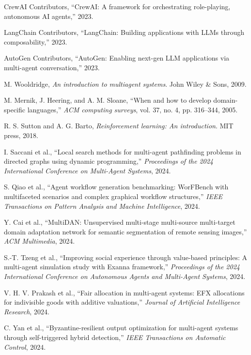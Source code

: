 \documentclass[conference]{IEEEtran}
\begin{document}
\begin{thebibliography}{00}
 CrewAI Contributors, ``CrewAI: A framework for orchestrating role-playing, autonomous AI agents,'' 2023.

 LangChain Contributors, ``LangChain: Building applications with LLMs through composability,'' 2023.

 AutoGen Contributors, ``AutoGen: Enabling next-gen LLM applications via multi-agent conversation,'' 2023.

 M. Wooldridge, \emph{An introduction to multiagent systems}. John Wiley \& Sons, 2009.

 M. Mernik, J. Heering, and A. M. Sloane, ``When and how to develop domain-specific languages,'' \emph{ACM computing surveys}, vol. 37, no. 4, pp. 316--344, 2005.

 R. S. Sutton and A. G. Barto, \emph{Reinforcement learning: An introduction}. MIT press, 2018.

 I. Saccani et al., ``Local search methods for multi-agent pathfinding problems in directed graphs using dynamic programming,'' \emph{Proceedings of the 2024 International Conference on Multi-Agent Systems}, 2024.

 S. Qiao et al., ``Agent workflow generation benchmarking: WorFBench with multifaceted scenarios and complex graphical workflow structures,'' \emph{IEEE Transactions on Pattern Analysis and Machine Intelligence}, 2024.

 Y. Cai et al., ``MultiDAN: Unsupervised multi-stage multi-source multi-target domain adaptation network for semantic segmentation of remote sensing images,'' \emph{ACM Multimedia}, 2024.

 S.-T. Tzeng et al., ``Improving social experience through value-based principles: A multi-agent simulation study with Exanna framework,'' \emph{Proceedings of the 2024 International Conference on Autonomous Agents and Multi-Agent Systems}, 2024.

 V. H. V. Prakash et al., ``Fair allocation in multi-agent systems: EFX allocations for indivisible goods with additive valuations,'' \emph{Journal of Artificial Intelligence Research}, 2024.

 C. Yan et al., ``Byzantine-resilient output optimization for multi-agent systems through self-triggered hybrid detection,'' \emph{IEEE Transactions on Automatic Control}, 2024.


\end{thebibliography}
\end{document}
